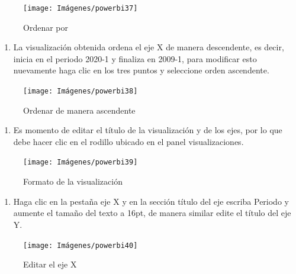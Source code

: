 \documentclass[
]{book}
\providecommand{\tightlist}{%
  \setlength{\itemsep}{0pt}\setlength{\parskip}{0pt}}
\begin{document}
\begin{figure}

{\centering \texttt{[image: Imágenes/powerbi37]} 

}

\caption{Ordenar por}\label{fig:paso5lineaspowerbi-fig}
\end{figure}

\begin{enumerate}
\def\labelenumi{\arabic{enumi}.}
\setcounter{enumi}{5}
\tightlist
\item
  La visualización obtenida ordena el eje X de manera descendente, es decir, inicia en el periodo 2020-1 y finaliza en 2009-1, para modificar esto nuevamente haga clic en los tres puntos y seleccione orden ascendente.
\end{enumerate}

\begin{figure}

{\centering \texttt{[image: Imágenes/powerbi38]} 

}

\caption{Ordenar de manera ascendente}\label{fig:paso6lineaspowerbi-fig}
\end{figure}

\begin{enumerate}
\def\labelenumi{\arabic{enumi}.}
\setcounter{enumi}{6}
\tightlist
\item
  Es momento de editar el título de la visualización y de los ejes, por lo que debe hacer clic en el rodillo ubicado en el panel visualizaciones.
\end{enumerate}

\begin{figure}

{\centering \texttt{[image: Imágenes/powerbi39]} 

}

\caption{Formato de la visualización}\label{fig:paso7lineaspowerbi-fig}
\end{figure}

\begin{enumerate}
\def\labelenumi{\arabic{enumi}.}
\setcounter{enumi}{7}
\tightlist
\item
  Haga clic en la pestaña eje X y en la sección título del eje escriba Periodo y aumente el tamaño del texto a 16pt, de manera similar edite el título del eje Y.
\end{enumerate}

\begin{figure}

{\centering \texttt{[image: Imágenes/powerbi40]} 

}

\caption{Editar el eje X}\label{fig:paso8lineaspowerbi-fig}
\end{figure}
\end{document}
